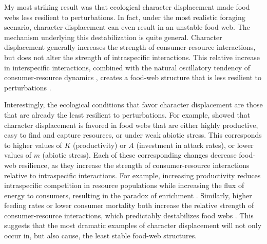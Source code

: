 \documentclass[11pt,]{article}
\begin{document}
My most striking result was that ecological character displacement made
food webs less resilient to perturbations. In fact, under the most
realistic foraging scenario, character displacement can even result in
an unstable food web. The mechanism underlying this destabilization is
quite general. Character displacement generally increases the strength
of consumer-resource interactions, but does not alter the strength of
intraspecific interactions. This relative increase in interspecific
interactions, combined with the natural oscillatory tendency of
consumer-resource dynamics \citep{Lotka1925, Volterra1926}, creates a
food-web structure that is less resilient to perturbations
\citep{Chesson2008, Rip2011, McCann2011}.

Interestingly, the ecological conditions that favor character
displacement are those that are already the least resilient to
perturbations. For example, \citet{McPeek2019} showed that character
displacement is favored in food webs that are either highly productive,
easy to find and capture resources, or under weak abiotic stress. This
corresponds to higher values of \(K\) (productivity) or \(A\)
(investment in attack rates), or lower values of \(m\) (abiotic stress).
Each of these corresponding changes decrease food-web resilience, as
they increase the strength of consumer-resource interactions relative to
intraspecific interactions. For example, increasing productivity reduces
intraspecific competition in resource populations while increasing the
flux of energy to consumers, resulting in the paradox of enrichment
\citep{Rosenzweig1971}. Similarly, higher feeding rates or lower
consumer mortality both increase the relative strength of
consumer-resource interactions, which predictably destabilizes food webs
\citep{Rip2011, McCann2011}. This suggests that the most dramatic
examples of character displacement will not only occur in, but also
cause, the least stable food-web structures.
\end{document}

